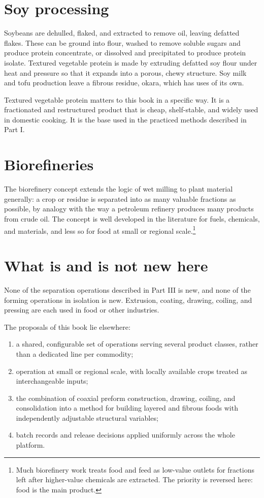 \documentclass[11pt,openany]{book}
\theoremstyle{definition}
\begin{document}
\section{Soy processing}

Soybeans are dehulled, flaked, and extracted to remove oil, leaving defatted flakes. These can be ground into flour, washed to remove soluble sugars and produce protein concentrate, or dissolved and precipitated to produce protein isolate. Textured vegetable protein is made by extruding defatted soy flour under heat and pressure so that it expands into a porous, chewy structure. Soy milk and tofu production leave a fibrous residue, okara, which has uses of its own.

Textured vegetable protein matters to this book in a specific way. It is a fractionated and restructured product that is cheap, shelf-stable, and widely used in domestic cooking. It is the base used in the practiced methods described in Part I.

\section{Biorefineries}

The biorefinery concept extends the logic of wet milling to plant material generally: a crop or residue is separated into as many valuable fractions as possible, by analogy with the way a petroleum refinery produces many products from crude oil. The concept is well developed in the literature for fuels, chemicals, and materials, and less so for food at small or regional scale.\footnote{Much biorefinery work treats food and feed as low-value outlets for fractions left after higher-value chemicals are extracted. The priority is reversed here: food is the main product.}

\section{What is and is not new here}

None of the separation operations described in Part III is new, and none of the forming operations in isolation is new. Extrusion, coating, drawing, coiling, and pressing are each used in food or other industries.

The proposals of this book lie elsewhere:

\begin{enumerate}
\item a shared, configurable set of operations serving several product classes, rather than a dedicated line per commodity;
\item operation at small or regional scale, with locally available crops treated as interchangeable inputs;
\item the combination of coaxial preform construction, drawing, coiling, and consolidation into a method for building layered and fibrous foods with independently adjustable structural variables;
\item batch records and release decisions applied uniformly across the whole platform.
\end{enumerate}
\end{document}
